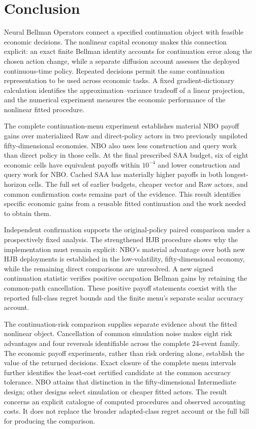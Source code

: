 \section{Conclusion}\label{sec:conclusion}
Neural Bellman Operators connect a specified continuation object with feasible
economic decisions. The nonlinear capital economy makes this connection
explicit: an exact finite Bellman identity accounts for continuation error
along the chosen action change, while a separate diffusion account assesses
the deployed continuous-time policy. Repeated decisions permit the same
continuation representation to be used across economic tasks. A fixed
gradient-dictionary calculation identifies the approximation--variance
tradeoff of a linear projection, and the numerical experiment measures the
economic performance of the nonlinear fitted procedure.

The complete continuation-menu experiment establishes material NBO payoff
gains over materialized Raw and direct-policy actors in two previously
unpiloted fifty-dimensional economies. NBO also uses less construction and
query work than direct policy in those cells. At the final prescribed SAA
budget, six of eight economic cells have equivalent payoffs within
$10^{-4}$ and lower construction and query work for NBO. Cached SAA has
materially higher payoffs in both longest-horizon cells. The full set of
earlier budgets, cheaper vector and Raw actors, and common confirmation
costs remains part of the evidence. This result identifies specific
economic gains from a reusable fitted continuation and the work needed
to obtain them.

Independent confirmation supports the original-policy paired comparison
under a prospectively fixed analysis. The strengthened HJB procedure shows
why the implementation must remain explicit: NBO's material advantage
over both new HJB deployments is established in the low-volatility,
fifty-dimensional economy, while the remaining direct comparisons are
unresolved. A new signed continuation statistic verifies positive
occupation Bellman gains by retaining the common-path cancellation.
These positive payoff statements coexist with the reported full-class
regret bounds and the finite menu's separate scalar accuracy account.

The continuation-risk comparison supplies separate evidence about the fitted nonlinear object. Cancellation of common simulation noise makes eight risk advantages and four reversals identifiable across the complete 24-event family. The economic payoff experiments, rather than risk ordering alone, establish the value of the returned decisions. Exact closure of the complete menu intervals further identifies the least-cost certified candidate at the common accuracy tolerance. NBO attains that distinction in the fifty-dimensional Intermediate design; other designs select simulation or cheaper fitted actors. The result concerns an explicit catalogue of computed procedures and observed accounting costs. It does not replace the broader adapted-class regret account or the full bill for producing the comparison.

